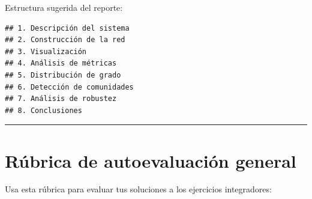 \documentclass[
  letterpaper,
  DIV=11,
  numbers=noendperiod]{scrreprt}
\begin{document}
\begin{tcolorbox}[enhanced jigsaw, toprule=.15mm, colframe=quarto-callout-note-color-frame, coltitle=black, titlerule=0mm, colback=white, breakable, leftrule=.75mm, arc=.35mm, bottomtitle=1mm, toptitle=1mm, rightrule=.15mm, bottomrule=.15mm, left=2mm, title=\textcolor{quarto-callout-note-color}{\faInfo}\hspace{0.5em}{💡 Pista 2}, colbacktitle=quarto-callout-note-color!10!white, opacityback=0, opacitybacktitle=0.6]

Estructura sugerida del reporte:

\begin{verbatim}
## 1. Descripción del sistema
## 2. Construcción de la red
## 3. Visualización
## 4. Análisis de métricas
## 5. Distribución de grado
## 6. Detección de comunidades
## 7. Análisis de robustez
## 8. Conclusiones
\end{verbatim}

\end{tcolorbox}

\begin{center}\rule{0.5\linewidth}{0.5pt}\end{center}

\section*{Rúbrica de autoevaluación
general}\label{ruxfabrica-de-autoevaluaciuxf3n-general}


Usa esta rúbrica para evaluar tus soluciones a los ejercicios
integradores:
\end{document}

